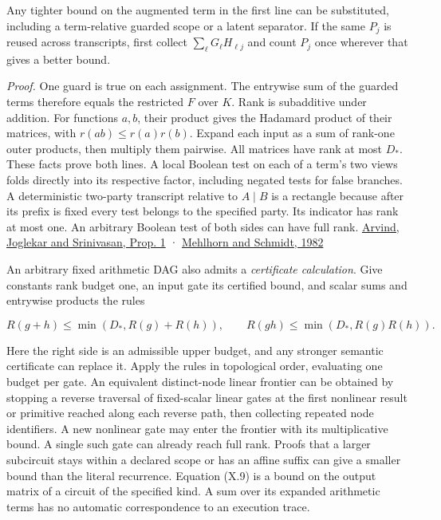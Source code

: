 \documentclass[
  11pt,
]{article}
\begin{document}
Any tighter bound on the augmented term in the first line can be
substituted, including a term-relative guarded scope or a latent
separator. If the same \(P_j\) is reused across transcripts, first
collect \(\sum_\ell G_\ell H_{\ell j}\) and count \(P_j\) once wherever
that gives a better bound.

\emph{Proof.} One guard is true on each assignment. The entrywise sum of
the guarded terms therefore equals the restricted \(F\) over \(K\). Rank
is subadditive under addition. For functions \(a,b\), their product
gives the Hadamard product of their matrices, with
\(r(ab)\le r(a)r(b)\). Expand each input as a sum of rank-one outer
products, then multiply them pairwise. All matrices have rank at most
\(D_*\). These facts prove both lines. A local Boolean test on each of a
term's two views folds directly into its respective factor, including
negated tests for false branches. A deterministic two-party transcript
relative to \(A\mid B\) is a rectangle because after its prefix is fixed
every test belongs to the specified party. Its indicator has rank at
most one. An arbitrary Boolean test of both sides can have full rank.
\href{https://arxiv.org/pdf/0907.4006}{Arvind, Joglekar and Srinivasan,
Prop. 1} · \href{https://doi.org/10.1145/800070.802208}{Mehlhorn and
Schmidt, 1982}

An arbitrary fixed arithmetic DAG also admits a \emph{certificate
calculation}. Give constants rank budget one, an input gate its
certified bound, and scalar sums and entrywise products the rules

\[
 R(g+h)\le\min(D_*,R(g)+R(h)),\qquad
 R(gh)\le\min(D_*,R(g)R(h)).
 \tag{X.9}
\]

Here the right side is an admissible upper budget, and any stronger
semantic certificate can replace it. Apply the rules in topological
order, evaluating one budget per gate. An equivalent distinct-node
linear frontier can be obtained by stopping a reverse traversal of
fixed-scalar linear gates at the first nonlinear result or primitive
reached along each reverse path, then collecting repeated node
identifiers. A new nonlinear gate may enter the frontier with its
multiplicative bound. A single such gate can already reach full rank.
Proofs that a larger subcircuit stays within a declared scope or has an
affine suffix can give a smaller bound than the literal recurrence.
Equation (X.9) is a bound on the output matrix of a circuit of the
specified kind. A sum over its expanded arithmetic terms has no
automatic correspondence to an execution trace.
\end{document}
